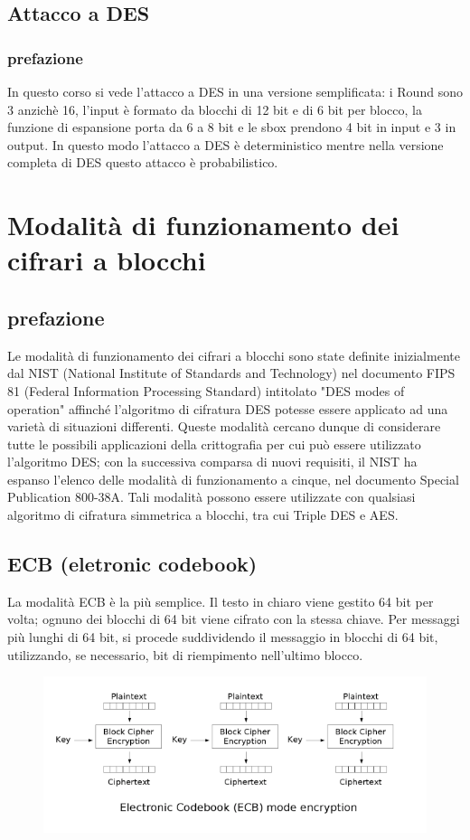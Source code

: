 \documentclass[10pt,a4paper]{article}
\begin{document}
\subsection{Attacco a DES}
\subsubsection{prefazione}
In questo corso si vede l'attacco a DES in una versione semplificata: i Round sono 3 anzichè 16, l'input è formato da blocchi di 12 bit e di 6 bit per blocco, la funzione di espansione porta da 6 a 8 bit e le sbox prendono 4 bit in input e 3 in output. In questo modo l'attacco a DES è deterministico mentre nella versione completa di DES questo attacco è probabilistico.

\section{Modalità di funzionamento dei cifrari a blocchi}
\subsection{prefazione}
Le modalità di funzionamento dei cifrari a blocchi sono state definite inizialmente dal NIST (National Institute of Standards and Technology) nel documento FIPS 81 (Federal Information Processing Standard) intitolato "DES modes of operation" affinché l'algoritmo di cifratura DES potesse essere applicato ad una varietà di situazioni differenti.
Queste modalità cercano dunque di considerare tutte le possibili applicazioni della crittografia per cui può essere utilizzato l'algoritmo DES; con la successiva comparsa di nuovi requisiti, il NIST ha espanso l'elenco delle modalità di funzionamento a cinque, nel documento Special Publication 800-38A.
Tali modalità possono essere utilizzate con qualsiasi algoritmo di cifratura simmetrica a blocchi, tra cui Triple DES e AES.
\subsection{ECB (eletronic codebook)}
La modalità ECB è la più semplice. Il testo in chiaro viene gestito 64 bit per volta; ognuno dei blocchi di 64 bit viene cifrato con la stessa chiave. Per messaggi più lunghi di 64 bit, si procede suddividendo il messaggio in blocchi di 64 bit, utilizzando, se necessario, bit di riempimento nell'ultimo blocco.

\begin{figure}[htbp]
\includegraphics[scale=0.6]{immagini/ecb.png}
\end{figure}
\end{document}
